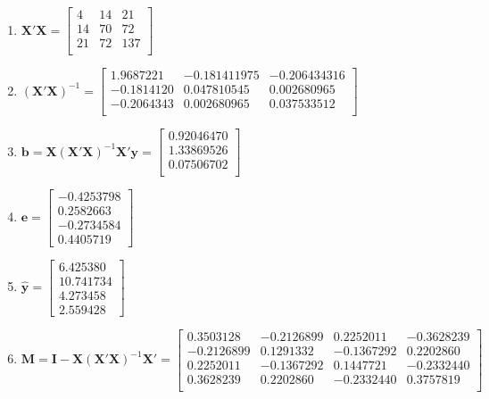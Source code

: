 \documentclass[
  11pt,
]{article}
\begin{document}
\begin{enumerate}
  \begin{enumerate}
  \def\labelenumii{\alph{enumii}.}
  \item
    \(\mathbf{X}'\mathbf{X}=  \begin{bmatrix}  4 & 14 & 21 \\  14 & 70 & 72 \\  21 & 72 & 137 \\  \end{bmatrix}\)
  \item
    \((\mathbf{X}'\mathbf{X})^{-1}=  \begin{bmatrix}  1.9687221 & -0.181411975 & -0.206434316 \\  -0.1814120 & 0.047810545 & 0.002680965 \\  -0.2064343 & 0.002680965 & 0.037533512 \\  \end{bmatrix}\)
  \item
    \(\mathbf{b}=\mathbf{X}(\mathbf{X}'\mathbf{X})^{-1}\mathbf{X}'\mathbf{y}=  \begin{bmatrix}  0.92046470 \\  1.33869526 \\  0.07506702 \\  \end{bmatrix}\)
  \item
    \(\mathbf{e}=  \begin{bmatrix}  -0.4253798 \\  0.2582663 \\  -0.2734584 \\  0.4405719  \end{bmatrix}\)
  \item
    \(\hat{\mathbf{y}}=  \begin{bmatrix}  6.425380 \\  10.741734 \\  4.273458 \\  2.559428  \end{bmatrix}\)
  \item
    \(\mathbf{M}=\mathbf{I}-\mathbf{X}(\mathbf{X}'\mathbf{X})^{-1}\mathbf{X}'=  \begin{bmatrix}  0.3503128 & -0.2126899 & 0.2252011 & -0.3628239 \\  -0.2126899 & 0.1291332 & -0.1367292 & 0.2202860 \\  0.2252011 & -0.1367292 & 0.1447721 & -0.2332440 \\  0.3628239 & 0.2202860 & -0.2332440 & 0.3757819 \\  \end{bmatrix}\)

\end{enumerate}
\end{enumerate}
\end{document}
